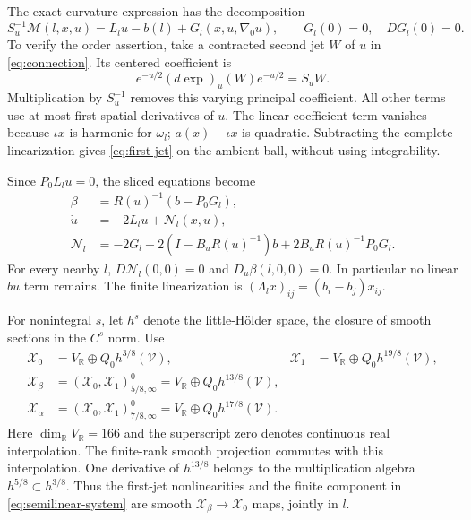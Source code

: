 \documentclass[11pt]{amsart}
\theoremstyle{definition}
\theoremstyle{remark}
\newcommand{\RR}{\mathbb R}
\begin{document}
The exact curvature expression has the decomposition
\begin{equation}\label{eq:first-jet}
 S_u^{-1}\mathcal M(l,x,u)
   =L_lu-b(l)+G_l(x,u,\nabla_0u),\qquad
 G_l(0)=0,\quad DG_l(0)=0.
\end{equation}
To verify the order assertion, take a contracted second jet $W$ of
$u$ in \eqref{eq:connection}. Its centered coefficient is
\[
 e^{-u/2}(d\exp)_u(W)e^{-u/2}=S_uW .
\]
Multiplication by $S_u^{-1}$ removes this varying principal
coefficient. All other terms use at most first spatial derivatives
of $u$. The linear coefficient term vanishes because $\iota x$
is harmonic for $\omega_l$; $a(x)-\iota x$ is quadratic. Subtracting
the complete linearization gives \eqref{eq:first-jet} on the
ambient ball, without using integrability.

Since $P_0L_lu=0$, the sliced equations become
\begin{equation}\label{eq:semilinear-system}
 \begin{aligned}
 \beta&=R(u)^{-1}(b-P_0G_l),\\
 \dot u&=-2L_lu+\mathcal N_l(x,u),\\
 \mathcal N_l&=-2G_l+2(I-B_uR(u)^{-1})b
                    +2B_uR(u)^{-1}P_0G_l.
 \end{aligned}
\end{equation}
For every nearby $l$, $D\mathcal N_l(0,0)=0$ and
$D_u\beta(l,0,0)=0$. In particular no linear $bu$ term remains.
The finite linearization is
$(\Lambda_lx)_{ij}=(b_i-b_j)x_{ij}$.

For nonintegral $s$, let $h^s$ denote the little-H\"older space,
the closure of smooth sections in the $C^s$ norm. Use
\begin{equation}\label{eq:parabolic-spaces}
 \begin{aligned}
 \mathcal X_0&=V_{\RR}\oplus Q_0h^{3/8}(\mathcal V),&
 \mathcal X_1&=V_{\RR}\oplus Q_0h^{19/8}(\mathcal V),\\
 \mathcal X_\beta&=(\mathcal X_0,\mathcal X_1)^0_{5/8,\infty}
       =V_{\RR}\oplus Q_0h^{13/8}(\mathcal V),\\
 \mathcal X_\alpha&=(\mathcal X_0,\mathcal X_1)^0_{7/8,\infty}
       =V_{\RR}\oplus Q_0h^{17/8}(\mathcal V).
 \end{aligned}
\end{equation}
Here $\dim_{\RR}V_{\RR}=166$ and the superscript zero denotes
continuous real interpolation. The finite-rank smooth projection
commutes with this interpolation. One derivative of $h^{13/8}$
belongs to the multiplication algebra $h^{5/8}\subset h^{3/8}$.
Thus the first-jet nonlinearities and the finite component in
\eqref{eq:semilinear-system} are smooth $\mathcal X_\beta\to
\mathcal X_0$ maps, jointly in $l$.
\end{document}
